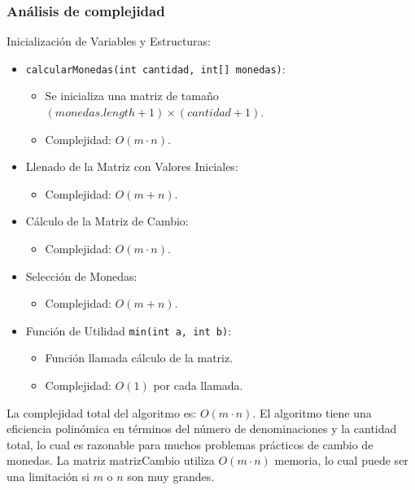 \subsubsection{Análisis de complejidad}
Inicialización de Variables y Estructuras:
\begin{itemize}
    \item \texttt{calcularMonedas(int cantidad, int[] monedas)}:
    \begin{itemize}
        \item Se inicializa una matriz de tamaño \((monedas.length + 1) \times (cantidad + 1)\).
        \item Complejidad: \(O(m \cdot n)\).
    \end{itemize}
    \item Llenado de la Matriz con Valores Iniciales:
    \begin{itemize}
        \item Complejidad: \(O(m + n)\).
    \end{itemize}
    \item Cálculo de la Matriz de Cambio:
    \begin{itemize}
        \item Complejidad: \(O(m \cdot n)\).
    \end{itemize}
    \item Selección de Monedas:
    \begin{itemize}
        \item Complejidad: \(O(m + n)\).
    \end{itemize}
    \item Función de Utilidad \texttt{min(int a, int b)}:
    \begin{itemize}
        \item Función llamada cálculo de la matriz.
        \item Complejidad: \(O(1)\) por cada llamada.
    \end{itemize}
\end{itemize}


La complejidad total del algoritmo es: \(O(m \cdot n)\). El algoritmo tiene una eficiencia polinómica en términos del número de denominaciones y la cantidad total, lo cual es razonable para muchos problemas prácticos de cambio de monedas. La matriz matrizCambio utiliza \(O(m \cdot n)\) memoria, lo cual puede ser una limitación si \(m\) o \(n\) son muy grandes.
